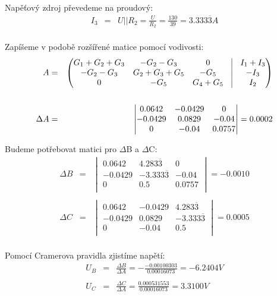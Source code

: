 \documentclass[a4paper,oneside,13pt]{article}
\begin{document}
	Napěťový zdroj převedeme na proudový:
	\begin{eqnarray*}
		I_{3} & = & U || R_{2} = \frac{U}{R_{2}} = \frac{130}{39} = 3.333\overline{3}A \\
	\end{eqnarray*}

	Zapíšeme v podobě rozšířené matice pomocí vodivosti:
	\begin{eqnarray*}
		A & = &
			\begin{pmatrix}			
				G_{1} + G_{2} + G_{3} & -G_{2} -G_{3} & 0 & \vline & I_{1} + I_{3} \\
				-G_{2} -G_{3} & G_{2} + G_{3} + G_{5} & -G_{5} & \vline & -I_{3} \\
				0 & -G_{5} &G_{4} + G_{5}& \vline & I_{2} \\
			\end{pmatrix} \\
		\\
		\Delta A & = &
			\begin{vmatrix}
				0.0642 & -0.0429 & 0 \\
				-0.0429 & 0.0829 & -0.04 \\
				0 & -0.04 & 0.0757 \\
			\end{vmatrix} = 0.0002 
	\end{eqnarray*}

	Budeme potřebovat matici pro $\Delta$B a $\Delta$C:
	\begin{eqnarray*}
		\Delta B & = & 
			\begin{vmatrix}
				0.0642 &  4.283\overline{3} & 0 \\
				-0.0429 & -3.333\overline{3} & -0.04 \\
				0 & 0.5 & 0.0757 \\
			\end{vmatrix} = -0.0010 \\
		\\
		\Delta C & = &
			\begin{vmatrix}
				0.0642 & -0.0429 & 4.283\overline{3} \\
				-0.0429 & 0.0829 & -3.333\overline{3} \\
				0 & -0.04 & 0.5 \\
			\end{vmatrix} = 0.0005 \\
	\end{eqnarray*}
	
	Pomocí Cramerova pravidla zjistíme napětí:
	\begin{eqnarray*}
		U_{B} & = & \frac{\Delta B}{\Delta A} = -\frac{-0.00100303}{0.00016073} = -6.2404V \\ 
		\\
		U_{C} & = & \frac{\Delta C}{\Delta A} = \frac{0.000531553}{0.00016073} = 3.3100V \\
	\end{eqnarray*}
\end{document}

